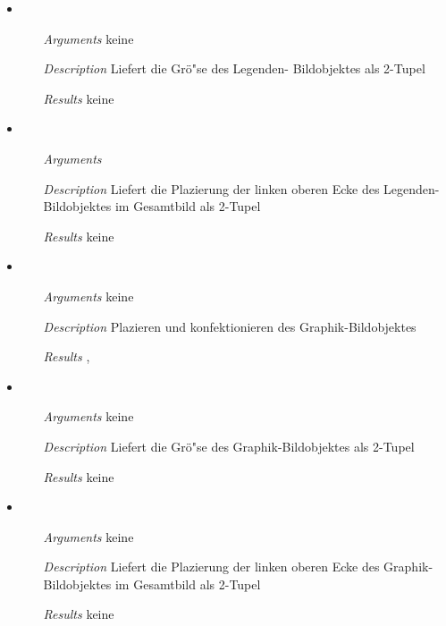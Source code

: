 \begin{description}
\begin{itemize}
\item {}
\begin{enumerate}
\item[\textit{Arguments}] keine
\item[\textit{Description}] Liefert die Gr\"o"se des Legenden-
  Bildobjektes als 2-Tupel
\item[\textit{Results}] keine
\end{enumerate}

\item {}
\begin{enumerate}
\item[\textit{Arguments}]
\item[\textit{Description}] Liefert die Plazierung der linken oberen
  Ecke des Legenden-Bildobjektes im Gesamtbild als 2-Tupel
\item[\textit{Results}] keine
\end{enumerate}

\item {}
\begin{enumerate}
\item[\textit{Arguments}] keine
\item[\textit{Description}]Plazieren und konfektionieren des
  Graphik-Bildobjektes
\item[\textit{Results}] ,
\end{enumerate}

\item {}
\begin{enumerate}
\item[\textit{Arguments}] keine
\item[\textit{Description}] Liefert die Gr\"o"se des
  Graphik-Bildobjektes als 2-Tupel
\item[\textit{Results}] keine
\end{enumerate}

\item {}
\begin{enumerate}
\item[\textit{Arguments}] keine
\item[\textit{Description}] Liefert die Plazierung der linken oberen
  Ecke des Graphik-Bildobjektes im Gesamtbild als 2-Tupel
\item[\textit{Results}] keine
\end{enumerate}


\end{itemize}
\end{description}
